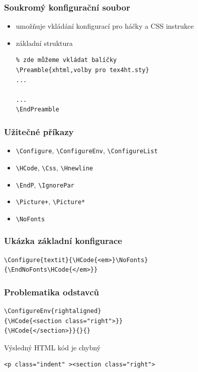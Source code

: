 \begin{frame}[fragile]
  \frametitle{Soukromý konfigurační soubor}
  \begin{itemize}
    \item umožňuje vkládání konfigurací pro háčky a CSS instrukce
    \item základní struktura
      \begin{verbatim}
% zde můžeme vkládat balíčky
\Preamble{xhtml,volby pro tex4ht.sty}
...

...
\EndPreamble
      \end{verbatim}
  \end{itemize}
\end{frame}



\begin{frame}[fragile]
  \frametitle{Užitečné příkazy}
  \begin{itemize} 
  \item \verb|\Configure|, \verb|\ConfigureEnv|, \verb|\ConfigureList|
  \item \verb|\HCode|, \verb|\Css|, \verb|\Hnewline|
  \item \verb|\EndP|, \verb|\IgnorePar|
  \item \verb|\Picture+|, \verb|\Picture*|
  \item \verb|\NoFonts|
\end{itemize}
\end{frame}

\begin{frame}[fragile]
  \frametitle{Ukázka základní konfigurace}
  \begin{priklad}
\begin{verbatim}
\Configure{textit}{\HCode{<em>}\NoFonts}
{\EndNoFonts\HCode{</em>}}
\end{verbatim}
  \end{priklad}
\end{frame}


\begin{frame}[fragile]
  \frametitle{Problematika odstavců}
  \begin{priklad}
\begin{verbatim}
\ConfigureEnv{rightaligned}
{\HCode{<section class="right">}}
{\HCode{</section>}}{}{}
\end{verbatim}
\end{priklad}
Výsledný HTML kód je chybný
\begin{priklad}
\begin{verbatim}
<p class="indent" ><section class="right">
\end{verbatim}
\end{priklad}
\end{frame}

